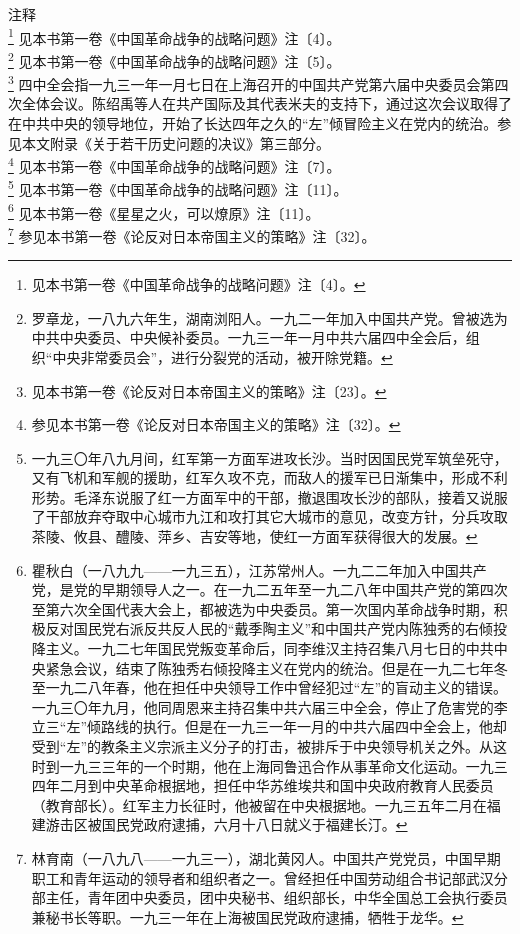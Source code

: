 \documentclass[cn,11pt,chinese]{elegantbook}
\begin{document}
注释\\
\footnote[1]{ 见本书第一卷《中国革命战争的战略问题》注〔4〕。} 见本书第一卷《中国革命战争的战略问题》注〔4〕。\\
\footnote[2]{ 罗章龙，一八九六年生，湖南浏阳人。一九二一年加入中国共产党。曾被选为中共中央委员、中央候补委员。一九三一年一月中共六届四中全会后，组织“中央非常委员会”，进行分裂党的活动，被开除党籍。} 见本书第一卷《中国革命战争的战略问题》注〔5〕。\\
\footnote[3]{ 见本书第一卷《论反对日本帝国主义的策略》注〔23〕。} 四中全会指一九三一年一月七日在上海召开的中国共产党第六届中央委员会第四次全体会议。陈绍禹等人在共产国际及其代表米夫的支持下，通过这次会议取得了在中共中央的领导地位，开始了长达四年之久的“左”倾冒险主义在党内的统治。参见本文附录《关于若干历史问题的决议》第三部分。\\
\footnote[4]{ 参见本书第一卷《论反对日本帝国主义的策略》注〔32〕。} 见本书第一卷《中国革命战争的战略问题》注〔7〕。\\
\footnote[5]{ 一九三〇年八九月间，红军第一方面军进攻长沙。当时因国民党军筑垒死守，又有飞机和军舰的援助，红军久攻不克，而敌人的援军已日渐集中，形成不利形势。毛泽东说服了红一方面军中的干部，撤退围攻长沙的部队，接着又说服了干部放弃夺取中心城市九江和攻打其它大城市的意见，改变方针，分兵攻取茶陵、攸县、醴陵、萍乡、吉安等地，使红一方面军获得很大的发展。} 见本书第一卷《中国革命战争的战略问题》注〔11〕。\\
\footnote[6]{ 瞿秋白（一八九九——一九三五），江苏常州人。一九二二年加入中国共产党，是党的早期领导人之一。在一九二五年至一九二八年中国共产党的第四次至第六次全国代表大会上，都被选为中央委员。第一次国内革命战争时期，积极反对国民党右派反共反人民的“戴季陶主义”和中国共产党内陈独秀的右倾投降主义。一九二七年国民党叛变革命后，同李维汉主持召集八月七日的中共中央紧急会议，结束了陈独秀右倾投降主义在党内的统治。但是在一九二七年冬至一九二八年春，他在担任中央领导工作中曾经犯过“左”的盲动主义的错误。一九三〇年九月，他同周恩来主持召集中共六届三中全会，停止了危害党的李立三“左”倾路线的执行。但是在一九三一年一月的中共六届四中全会上，他却受到“左”的教条主义宗派主义分子的打击，被排斥于中央领导机关之外。从这时到一九三三年的一个时期，他在上海同鲁迅合作从事革命文化运动。一九三四年二月到中央革命根据地，担任中华苏维埃共和国中央政府教育人民委员（教育部长）。红军主力长征时，他被留在中央根据地。一九三五年二月在福建游击区被国民党政府逮捕，六月十八日就义于福建长汀。} 见本书第一卷《星星之火，可以燎原》注〔11〕。\\
\footnote[7]{ 林育南（一八九八——一九三一），湖北黄冈人。中国共产党党员，中国早期职工和青年运动的领导者和组织者之一。曾经担任中国劳动组合书记部武汉分部主任，青年团中央委员，团中央秘书、组织部长，中华全国总工会执行委员兼秘书长等职。一九三一年在上海被国民党政府逮捕，牺牲于龙华。} 参见本书第一卷《论反对日本帝国主义的策略》注〔32〕。\\
\end{document}
